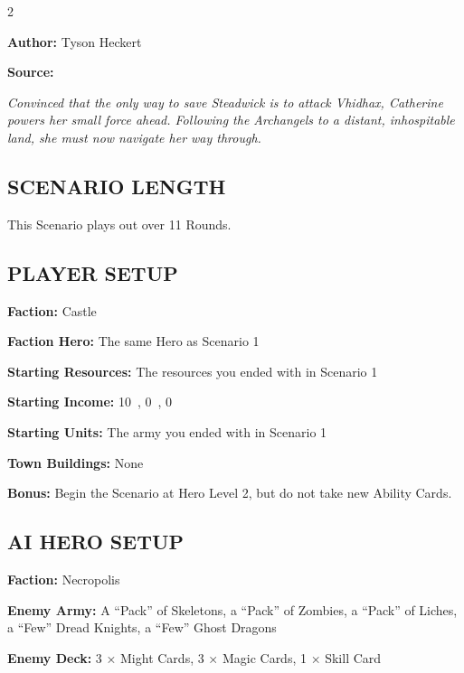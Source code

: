 
\begin{multicols}{2}

\textbf{Author:} Tyson Heckert

\textbf{Source:} 

\textit{Convinced that the only way to save Steadwick is to attack Vhidhax, Catherine powers her small force ahead.
Following the Archangels to a distant, inhospitable land, she must now navigate her way through.}

\subsection*{\MakeUppercase{Scenario length}}

This Scenario plays out over 11 Rounds.

\subsection*{\MakeUppercase{Player setup}}

\textbf{Faction:} Castle

\textbf{Faction Hero:} The same Hero as Scenario 1

\textbf{Starting Resources:} The resources you ended with in Scenario 1

\textbf{Starting Income:} 10~, 0~, 0~

\textbf{Starting Units:} The army you ended with in Scenario 1

\textbf{Town Buildings:} None

\textbf{Bonus:} Begin the Scenario at Hero Level 2, but do not take new Ability Cards.

\subsection*{\MakeUppercase{AI Hero setup}}

\textbf{Faction:} Necropolis

\textbf{Enemy Army:} A ``Pack'' of Skeletons, a ``Pack'' of Zombies, a ``Pack'' of Liches, a ``Few'' Dread Knights, a ``Few'' Ghost Dragons

\textbf{Enemy Deck:} 3 × Might Cards, 3 × Magic Cards, 1 × Skill Card


\end{multicols}
